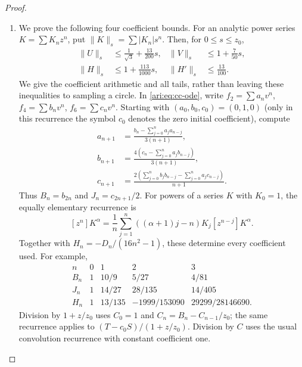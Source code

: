 \begin{proof}
\begin{enumerate}[label=\arabic*.,leftmargin=*]
\item We prove the following four coefficient bounds. For an analytic
power series $K=\sum K_nz^n$, put
$\|K\|_s=\sum|K_n|s^n$. Then, for $0\le s\le z_0$,
\begin{equation}\label{ari:eq:cc-norms}
 \begin{aligned}
 \|U\|_s&\le\frac1{\sqrt3}+\frac{13}{200}s,&
 \|V\|_s&\le1+\frac7{50}s,\\
 \|H\|_s&\le1+\frac{113}{1000}s,&
 \|H'\|_s&\le\frac{13}{100}.
 \end{aligned}
\end{equation}
We give the coefficient arithmetic and all tails, rather than
leaving these inequalities to sampling a circle. In
\eqref{ari:eq:cc-ode}, write $f_2=\sum a_nv^n$,
$f_4=\sum b_nv^n$, $f_6=\sum c_nv^n$. Starting with
$(a_0,b_0,c_0)=(0,1,0)$ (only in this recurrence the symbol
$c_0$ denotes the zero initial coefficient), compute
\begin{equation}\label{ari:eq:cc-recurrence}
 \begin{aligned}
 a_{n+1}&=\frac{b_n-\sum_{j=0}^na_ja_{n-j}}{3(n+1)},\\
 b_{n+1}&=\frac{4(c_n-\sum_{j=0}^na_jb_{n-j})}{3(n+1)},\\
 c_{n+1}&=\frac{2(\sum_{j=0}^nb_jb_{n-j}-
                          \sum_{j=0}^na_jc_{n-j})}{n+1}.
 \end{aligned}
\end{equation}
Thus $B_n=b_{2n}$ and $J_n=c_{2n+1}/2$. For powers of a series
$K$ with $K_0=1$, the equally elementary recurrence is
\begin{equation}\label{ari:eq:cc-power}
 [z^n]K^\alpha=\frac1n\sum_{j=1}^n
                 ((\alpha+1)j-n)K_j[z^{n-j}]K^\alpha.
\end{equation}
Together with $H_n=-D_n/(16n^2-1)$, these determine every
coefficient used. For example,
\[
 \begin{array}{c|rrrr}
 n&0&1&2&3\\ \hline
 B_n&1&10/9&5/27&4/81\\
 J_n&1&14/27&28/135&14/405\\
 H_n&1&13/135&-1999/153090&29299/28146690.
 \end{array}
\]
Division by $1+z/z_0$ uses $C_0=1$ and
$C_n=B_n-C_{n-1}/z_0$; the same recurrence applies to
$(T-c_0S)/(1+z/z_0)$. Division by $C$ uses the usual
convolution recurrence with constant coefficient one.


\end{enumerate}
\end{proof}
